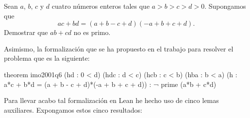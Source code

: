 \noindent
Sean \(a\), \(b\), \(c\) y \(d\) cuatro números enteros tales que
\(a > b > c > d > 0\). Supongamos que
\begin{equation}\label{ihipotesis}\tag{h}
  ac+bd = (a+b-c+d)(-a+b+c+d).
\end{equation}
Demostrar que \(ab+cd\) no es primo.

Asimismo, la formalización que se ha propuesto en el trabajo para
resolver el problema que es la siguiente:

\begin{leancode}
theorem imo2001q6
  (hd  : 0 < d)
  (hdc : d < c)
  (hcb : c < b)
  (hba : b < a)
  (h : a*c + b*d = (a + b - c + d)*(-a + b + c + d))
  : ¬ prime (a*b + c*d)
\end{leancode}

Para llevar acabo tal formalización en Lean he hecho uso de cinco lemas
auxiliares. Expongamos estos cinco resultados:
